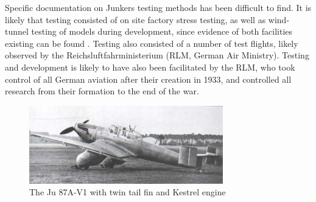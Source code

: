 \documentclass[a4paper, fontsize=11pt]{scrartcl} %
\begin{document}
Specific documentation on Junkers testing methods has been difficult to
find. It is likely that testing consisted of on site
factory stress testing, as well as wind-tunnel testing of models during
development, since evidence of both facilities existing can be found
\autocite{hirschel03}. Testing also consisted of a number of test
flights, likely observed by the Reichsluftfahrministerium (RLM, German
Air Ministry). Testing and development is likely to have also been
facilitated by the RLM, who took control of all German aviation after their creation
in 1933, and controlled all research from their formation to the end of
the war.

\begin{figure}[h]
  \centering
  \includegraphics[width=0.75\textwidth]{media/ju87av0}
  \caption{The Ju 87A-V1 with twin tail fin and Kestrel engine
    \autocite{junkers87}}
  \label{fig:v1}
\end{figure}
\printbibliography
\end{document}
